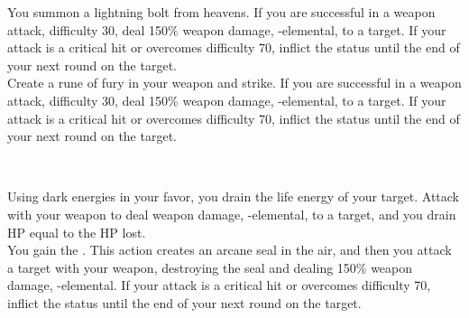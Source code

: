 \begin{tabjob}
         You summon a lightning bolt from heavens. If you are successful in a weapon attack, difficulty 30, deal 150\% weapon damage, -elemental, to a target. If your attack is a critical hit or overcomes difficulty 70, inflict the  status until the end of your next round on the target. \\

         Create a rune of fury in your weapon and strike. If you are successful in a weapon attack, difficulty 30, deal 150\% weapon damage, -elemental, to a target. If your attack is a critical hit or overcomes difficulty 70, inflict the  status until the end of your next round on the target. \\

    \tabjobsep%

    \\
    \tabjobspec{}

         Using dark energies in your favor, you drain the life energy of your target. Attack with your weapon to deal weapon damage, -elemental, to a target, and you drain HP equal to the HP lost\@. \\

         You gain the  . This action creates an arcane seal in the air, and then you attack a target with your weapon, destroying the seal and dealing 150\% weapon damage, -elemental. If your attack is a critical hit or overcomes difficulty 70, inflict the  status until the end of your next round on the target. \\


\end{tabjob}
